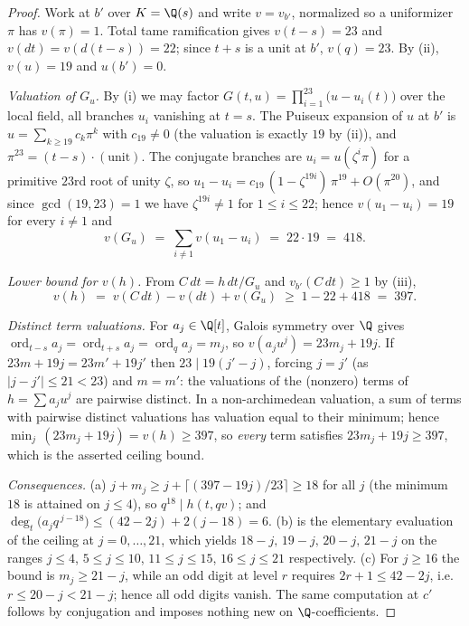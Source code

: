 \begin{proof}
Work at $b'$ over $K=\Q(s)$ and write $v=v_{b'}$, normalized so a
uniformizer $\pi$ has $v(\pi)=1$. Total tame ramification gives
$v(t-s)=23$ and $v(dt)=v(d(t-s))=22$; since $t+s$ is a unit at $b'$,
$v(q)=23$. By (ii), $v(u)=19$ and $u(b')=0$.

\emph{Valuation of $G_u$.} By (i) we may factor
$G(t,u)=\prod_{i=1}^{23}\bigl(u-u_i(t)\bigr)$ over the local field, all
branches $u_i$ vanishing at $t=s$. The Puiseux expansion of $u$ at $b'$
is $u=\sum_{k\ge 19}c_k\pi^{k}$ with $c_{19}\neq 0$ (the valuation is
exactly $19$ by (ii)), and $\pi^{23}=(t-s)\cdot(\text{unit})$. The
conjugate branches are $u_i=u(\zeta^{i}\pi)$ for a primitive $23$rd root
of unity $\zeta$, so
$u_1-u_i=c_{19}\,(1-\zeta^{19i})\,\pi^{19}+O(\pi^{20})$, and since
$\gcd(19,23)=1$ we have $\zeta^{19i}\neq 1$ for $1\le i\le 22$; hence
$v(u_1-u_i)=19$ for every $i\neq 1$ and
\[
v(G_u)\;=\;\sum_{i\neq 1}v(u_1-u_i)\;=\;22\cdot 19\;=\;418 .
\]

\emph{Lower bound for $v(h)$.} From $C\,dt=h\,dt/G_u$ and
$v_{b'}(C\,dt)\ge 1$ by (iii),
\[
v(h)\;=\;v(C\,dt)-v(dt)+v(G_u)\;\ge\;1-22+418\;=\;397 .
\]

\emph{Distinct term valuations.} For $a_j\in\Q[t]$, Galois symmetry over
$\Q$ gives $\operatorname{ord}_{t-s}a_j=\operatorname{ord}_{t+s}a_j
=\operatorname{ord}_q a_j=m_j$, so
$v(a_j u^{j})=23m_j+19j$. If $23m+19j=23m'+19j'$ then
$23\mid 19(j'-j)$, forcing $j=j'$ (as $|j-j'|\le 21<23$) and $m=m'$:
the valuations of the (nonzero) terms of $h=\sum a_ju^{j}$ are pairwise
distinct. In a non-archimedean valuation, a sum of terms with pairwise
distinct valuations has valuation equal to their minimum; hence
$\min_j\,(23m_j+19j)=v(h)\ge 397$, so \emph{every} term satisfies
$23m_j+19j\ge 397$, which is the asserted ceiling bound.

\emph{Consequences.} (a) $j+m_j\ge j+\lceil(397-19j)/23\rceil\ge 18$
for all $j$ (the minimum $18$ is attained on $j\le 4$), so
$q^{18}\mid h(t,qv)$; and
$\deg_t\bigl(a_jq^{\,j-18}\bigr)\le (42-2j)+2(j-18)=6$. (b) is the
elementary evaluation of the ceiling at $j=0,\dots,21$, which yields
$18{-}j,\,19{-}j,\,20{-}j,\,21{-}j$ on the ranges $j\le 4$, $5\le j\le
10$, $11\le j\le 15$, $16\le j\le 21$ respectively. (c) For $j\ge 16$
the bound is $m_j\ge 21-j$, while an odd digit at level $r$ requires
$2r+1\le 42-2j$, i.e.\ $r\le 20-j<21-j$; hence all odd digits vanish.
The same computation at $c'$ follows by conjugation and imposes nothing
new on $\Q$-coefficients.
\end{proof}

